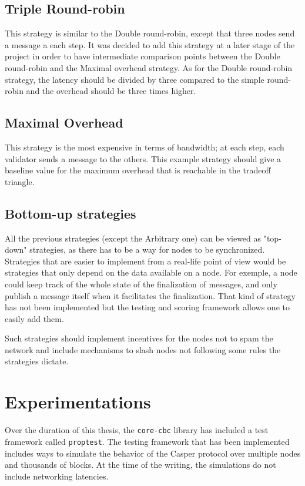 \subsection{Triple Round-robin}
This strategy is similar to the Double round-robin, except that three nodes send
a message a each step. It was decided to add this strategy at a later stage of
the project in order to have intermediate comparison points between the Double
round-robin and the Maximal overhead strategy. As for the Double round-robin
strategy, the latency should be divided by three compared to the simple
round-robin and the overhead should be three times higher.

\subsection{Maximal Overhead}
This strategy is the most expensive in terms of bandwidth; at each step, each
validator sends a message to the others. This example strategy should give a
baseline value for the maximum overhead that is reachable in the tradeoff
triangle.

\subsection{Bottom-up strategies}
All the previous strategies (except the Arbitrary one) can be viewed as
"top-down" strategies, as there has to be a way for nodes to be synchronized.
Strategies that are easier to implement from a real-life point of view would be
strategies that only depend on the data available on a node. For exemple, a node
could keep track of the whole state of the finalization of messages, and only
publish a message itself when it facilitates the finalization. That kind of
strategy has not been implemented but the testing and scoring framework allows
one to easily add them.

Such strategies should implement incentives for the nodes not to spam the
network and include mechanisms to slash nodes not following some rules the
strategies dictate.

\section{Experimentations}
Over the duration of this thesis, the \texttt{core-cbc} library has included a
test framework called \texttt{proptest}. The testing framework that has been
implemented includes ways to simulate the behavior of the Casper protocol over
multiple nodes and thousands  of blocks. At the time of the
writing, the simulations do not include networking latencies.

